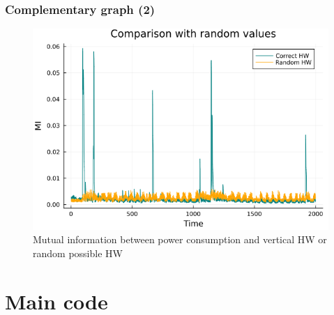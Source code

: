 \documentclass{beamer}
\begin{document}
	\begin{frame}
		\frametitle{Complementary graph (2)}
		\begin{figure}[H]
			\centering
			\includegraphics[scale=0.3]{img_files/HWalea}
			\caption{Mutual information between power consumption and vertical HW or random possible HW}
			\label{HWalea}
		\end{figure}
	\end{frame}
	
	\section{Main code} 
	
	
	
	
	
	
	
	
	
	
	
	
	
	
\end{document}

